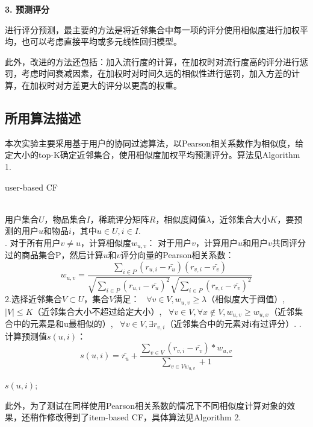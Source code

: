 \documentclass[12pt, a4paper]{ctexart}
\begin{document}
\textbf{3. 预测评分}

进行评分预测，最主要的方法是将近邻集合中每一项的评分使用相似度进行加权平均，也可以考虑直接平均或多元线性回归模型。

此外，改进的方法还包括：加入流行度的计算，在加权时对流行度高的评分进行惩罚，考虑时间衰减因素，在加权时对时间久远的相似性进行惩罚，加入方差的计算，在加权时对方差更大的评分以更高的权重。

\subsection{所用算法描述}

本次实验主要采用基于用户的协同过滤算法，以Pearson相关系数作为相似度，给定大小的top-K确定近邻集合，使用相似度加权平均预测评分。算法见Algorithm 1.

\begin{algorithm}[htb] 
\caption{user-based CF}
\label{alg:Framwork} 
\begin{algorithmic} 
\REQUIRE ~~\\ %
用户集合$U$，物品集合$I$，稀疏评分矩阵$R$，相似度阈值$\lambda$，近邻集合大小$K$，要预测的用户$u$和物品$i$，其中$u\in U,i \in I$.
\ENSURE ~~\\ %

. 对于所有用户$v\neq u$，计算相似度$w_{u,v}$：
\STATE 对于用户$v$，计算用户$u$和用户$v$共同评分过的商品集合P，然后计算$u$和$v$评分向量的Pearson相关系数：
$$w_{u,v} = 
\frac{\sum_{i\in P}{(r_{u,i} - \bar{r_u})(r_{v,i} - \bar{r_v})}}
{
\sqrt{\sum_{i\in P}{(r_{u,i} - \bar{r_u})}^2}
\sqrt{\sum_{i\in P}{(r_{v,i} - \bar{r_v})}^2}
}$$
\STATE 2.选择近邻集合$V\subset U$，集合$V$满足：
\STATE {}\ $\forall v \in V,w_{u,v}\geq \lambda$（相似度大于阈值）,
\STATE {}\ $\lvert V\lvert\leq K$（近邻集合大小不超过给定大小）,
\STATE {}\ $\forall v \in V,\forall x \not\in V, w_{u,v}\geq w_{u,x}$（近邻集合中的元素是和u最相似的）,
\STATE {}\ $\forall v \in V,\exists r_{v,i}$（近邻集合中的元素对i有过评分）.
. 计算预测值$s(u,i)$：
$$s(u,i)=\bar{r_u}+
\frac{\sum_{v\in V}{(r_{v,i} - \bar{r_v})*w_{u,v}}}
{\sum_{v\in V w_{u,v}}+1}$$

\RETURN $s(u,i)$; %
\end{algorithmic}
\end{algorithm}

此外，为了测试在同样使用Pearson相关系数的情况下不同相似度计算对象的效果，还稍作修改得到了item-based CF，具体算法见Algorithm 2.
\end{document}
